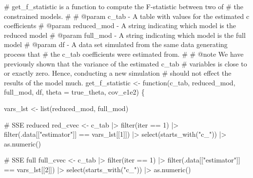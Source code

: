 \documentclass[
  letterpaper,
  DIV=11,
  numbers=noendperiod]{scrartcl}
\newenvironment{Shaded}{\begin{snugshade}}{\end{snugshade}}
\newcommand{\AttributeTok}[1]{\textcolor[rgb]{0.40,0.45,0.13}{#1}}
\newcommand{\CommentTok}[1]{\textcolor[rgb]{0.37,0.37,0.37}{#1}}
\newcommand{\ControlFlowTok}[1]{\textcolor[rgb]{0.00,0.23,0.31}{#1}}
\newcommand{\DecValTok}[1]{\textcolor[rgb]{0.68,0.00,0.00}{#1}}
\newcommand{\FunctionTok}[1]{\textcolor[rgb]{0.28,0.35,0.67}{#1}}
\newcommand{\NormalTok}[1]{\textcolor[rgb]{0.00,0.23,0.31}{#1}}
\newcommand{\OtherTok}[1]{\textcolor[rgb]{0.00,0.23,0.31}{#1}}
\newcommand{\SpecialCharTok}[1]{\textcolor[rgb]{0.37,0.37,0.37}{#1}}
\newcommand{\StringTok}[1]{\textcolor[rgb]{0.13,0.47,0.30}{#1}}
\begin{document}
\hypertarget{lst-getfstat}{%
\label{lst-getfstat}}%
\begin{Shaded}
\begin{Highlighting}[]
\CommentTok{\#\textquotesingle{} get\_f\_statistic is a function to compute the F{-}statistic between two of }
\CommentTok{\#\textquotesingle{} the constrained models.}
\CommentTok{\#\textquotesingle{}}
\CommentTok{\#\textquotesingle{} @param c\_tab {-} A table with values for the estimated c coefficients}
\CommentTok{\#\textquotesingle{} @param reduced\_mod {-} A string indicating which model is the reduced model}
\CommentTok{\#\textquotesingle{} @param full\_mod {-} A string indicating which model is the full model}
\CommentTok{\#\textquotesingle{} @param df {-} A data set simulated from the same data generating process that }
\CommentTok{\#\textquotesingle{}    the c\_tab coefficients were estimated from.}
\CommentTok{\#\textquotesingle{}}
\CommentTok{\#\textquotesingle{} @note We have previously shown that the variance of the estimated c\_tab }
\CommentTok{\#\textquotesingle{} variables is close to or exactly zero. Hence, conducting a new simulation }
\CommentTok{\#\textquotesingle{} should not effect the results of the model much.}
\NormalTok{get\_f\_statistic }\OtherTok{\textless{}{-}} 
  \ControlFlowTok{function}\NormalTok{(c\_tab, reduced\_mod, full\_mod, df, }\AttributeTok{theta =}\NormalTok{ true\_theta, cov\_e1e2) \{}

\NormalTok{  vars\_lst }\OtherTok{\textless{}{-}} \FunctionTok{list}\NormalTok{(reduced\_mod, full\_mod)}

  \CommentTok{\# SSE reduced }
\NormalTok{  red\_cvec }\OtherTok{\textless{}{-}}
\NormalTok{    c\_tab }\SpecialCharTok{|\textgreater{}}
    \FunctionTok{filter}\NormalTok{(iter }\SpecialCharTok{==} \DecValTok{1}\NormalTok{) }\SpecialCharTok{|\textgreater{}}
    \FunctionTok{filter}\NormalTok{(.data[[}\StringTok{"estimator"}\NormalTok{]] }\SpecialCharTok{==}\NormalTok{ vars\_lst[[}\DecValTok{1}\NormalTok{]]) }\SpecialCharTok{|\textgreater{}}
    \FunctionTok{select}\NormalTok{(}\FunctionTok{starts\_with}\NormalTok{(}\StringTok{"c\_"}\NormalTok{)) }\SpecialCharTok{|\textgreater{}}
    \FunctionTok{as.numeric}\NormalTok{()}

  \CommentTok{\# SSE full}
\NormalTok{  full\_cvec }\OtherTok{\textless{}{-}}
\NormalTok{    c\_tab }\SpecialCharTok{|\textgreater{}}
    \FunctionTok{filter}\NormalTok{(iter }\SpecialCharTok{==} \DecValTok{1}\NormalTok{) }\SpecialCharTok{|\textgreater{}}
    \FunctionTok{filter}\NormalTok{(.data[[}\StringTok{"estimator"}\NormalTok{]] }\SpecialCharTok{==}\NormalTok{ vars\_lst[[}\DecValTok{2}\NormalTok{]]) }\SpecialCharTok{|\textgreater{}}
    \FunctionTok{select}\NormalTok{(}\FunctionTok{starts\_with}\NormalTok{(}\StringTok{"c\_"}\NormalTok{)) }\SpecialCharTok{|\textgreater{}}
    \FunctionTok{as.numeric}\NormalTok{()}


\end{Highlighting}
\end{Shaded}
\end{document}

